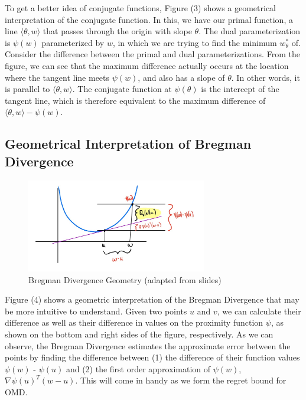 \documentclass[11pt]{article}
\begin{document}
To get a better idea of conjugate functions, Figure (3) shows a geometrical interpretation of the conjugate function. In this, we have our primal function, a line $\langle \theta, w \rangle$ that passes through the origin with slope $\theta$. The dual parameterization is $\psi(w)$ parameterized by $w$, in which we are trying to find the minimum $w_{\theta}^*$ of. Consider the difference between the primal and dual parameterizations. From the figure, we can see that the maximum difference actually occurs at the location where the tangent line meets $\psi(w)$, and also has a slope of $\theta$. In other words, it is parallel to $\langle \theta, w \rangle$. The conjugate function at $\psi (\theta)$ is the intercept of the tangent line, which is therefore equivalent to the maximum difference of $\langle \theta, w \rangle - \psi(w)$.


\subsection{Geometrical Interpretation of Bregman Divergence}

\begin{figure}[H]
    \centering
    \includegraphics[width=0.7\textwidth]{figs/Page3.jpg}
    \caption{Bregman Divergence Geometry (adapted from slides)}
    \label{fig:bregman}
\end{figure}

Figure (4) shows a geometric interpretation of the Bregman Divergence that may be more intuitive to understand. Given two points $u$ and $v$, we can calculate their difference as well as their difference in values on the proximity function $\psi$, as shown on the bottom and right sides of the figure, respectively. As we can observe, the Bregman Divergence estimates the approximate error between the points by finding the difference between (1) the difference of their function values $\psi(w)$ - $\psi(u)$ and (2) the first order approximation of $\psi(w)$, $\nabla \psi (u)^T(w-u)$. This will come in handy as we form the regret bound for OMD.
\end{document}
